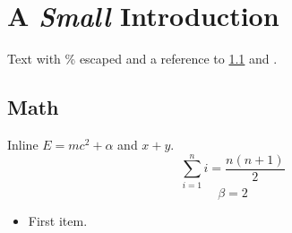 \documentclass{article}
\begin{document}
\section[Brief]{A \emph{Small} Introduction}
Text with \% escaped and a %
reference to \ref{sec:math} and \cite{smith2024}.
\subsection{Math}\label{sec:math}
Inline $E = mc^{2} + \alpha$ and \(x + y\).
$$ \sum_{i=1}^{n} i = \frac{n(n+1)}{2} $$
\[ \beta = 2 \]
\begin{itemize}
\item First item.
\end{itemize}
\end{document}

